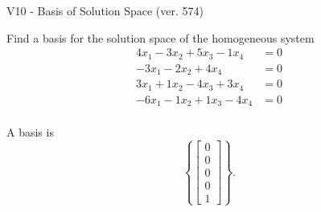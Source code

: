 \begin{exercise}
  \begin{exerciseTitle}V10 - Basis of Solution Space (ver. 574)\end{exerciseTitle}
  \begin{exerciseStatement}
    Find a basis for the solution space of the homogeneous system 
\begin{align*}
 4 x_ 1 -3 x_ 2 + 5 x_ 3 -1 x_ 4 &= 0  \\ 
  -3 x_ 1 -2 x_ 2 + 4 x_ 4 &= 0  \\ 
  3 x_ 1 + 1 x_ 2 -4 x_ 3 + 3 x_ 4 &= 0  \\ 
  -6 x_ 1 -1 x_ 2 + 1 x_ 3 -4 x_ 4 &= 0  \\ 
 \end{align*}


 
  \end{exerciseStatement}

  \begin{exerciseAnswer}
   A basis is   
\[\left\{\left[\begin{array}{c}
0 \\
0 \\
0 \\
0 \\
1
\end{array}\right]\right\}.\]

  


  \end{exerciseAnswer}
\end{exercise}